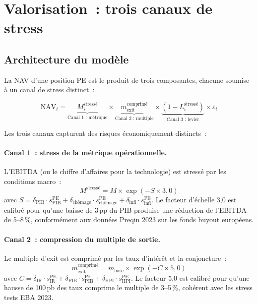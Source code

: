 \documentclass[12pt, a4paper, twoside, openright]{report}
\theoremstyle{definition}
\begin{document}
\section{Valorisation~: trois canaux de stress}
\label{sec:pe:valorisation}

\subsection{Architecture du modèle}

La NAV d'une position PE est le produit de trois composantes, chacune soumise à un canal de stress distinct~:

\begin{equation}
\text{NAV}_i = \underbrace{M_i^{\text{stressé}}}_{\text{Canal 1~: métrique}} \times \underbrace{m_{\text{exit}}^{\text{comprimé}}}_{\text{Canal 2~: multiple}} \times \underbrace{(1 - L_i^{\text{stressé}})}_{\text{Canal 3~: levier}} \times \varepsilon_i
\label{eq:nav}
\end{equation}

\noindent Les trois canaux capturent des risques économiquement distincts~:

\paragraph{Canal 1~: stress de la métrique opérationnelle.} L'EBITDA (ou le chiffre d'affaires pour la technologie) est stressé par les conditions macro~:
\begin{equation}
M^{\text{stressé}} = M \times \exp(-S \times 3{,}0)
\label{eq:metric-stress}
\end{equation}
avec $S = \delta_{\text{PIB}} \cdot s^{\text{PE}}_{\text{PIB}} + \delta_{\text{chômage}} \cdot s^{\text{PE}}_{\text{chômage}} + \delta_{\text{infl}} \cdot s^{\text{PE}}_{\text{infl}}$. Le facteur d'échelle 3{,}0 est calibré pour qu'une baisse de 3\,pp du PIB produise une réduction de l'EBITDA de 5--8\,\%, conformément aux données Preqin 2023 sur les fonds buyout européens.

\paragraph{Canal 2~: compression du multiple de sortie.} Le multiple d'exit est comprimé par les taux d'intérêt et la conjoncture~:
\begin{equation}
m_{\text{exit}}^{\text{comprimé}} = m_{\text{base}} \times \exp(-C \times 5{,}0)
\label{eq:multiple-compression}
\end{equation}
avec $C = \delta_{\text{IR}} \cdot s^{\text{PE}}_{\text{IR}} + \delta_{\text{PIB}} \cdot s^{\text{PE}}_{\text{PIB}} + \delta_{\text{HPI}} \cdot s^{\text{PE}}_{\text{HPI}}$. Le facteur 5{,}0 est calibré pour qu'une hausse de 100\,pb des taux comprime le multiple de 3--5\,\%, cohérent avec les stress tests EBA 2023.
\end{document}
